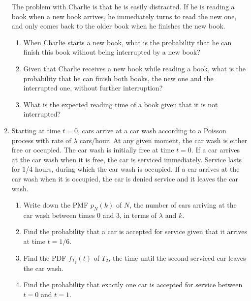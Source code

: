 \documentclass[a4paper,9pt,landscape]{extarticle}
\begin{document}
\begin{multicols*}{3}
\begin{enumerate}
	The problem with Charlie is that he is easily distracted. If he is reading a book when a new book arrives, he immediately turns to read the new one, and only comes back to the older book when he finishes the new book.
	\begin{enumerate}
		\item When Charlie starts a new book, what is the probability that he can finish this book without being interrupted by a new book?
		\item Given that Charlie receives a new book while reading a book, what is the probability that he can finish both books, the new one and the interrupted one, without further interruption?
		\item What is the expected reading time of a book given that it is not interrupted?
	\end{enumerate}
	\item Starting at time $t=0$, cars arrive at a car wash according to a Poisson process with rate of $\lambda$ cars/hour. At any given moment, the car wash is either free or occupied. The car wash is initially free at time $t=0$. If a car arrives at the car wash when it is free, the car is serviced immediately. Service lasts for 1/4 hours, during which the car wash is occupied. If a car arrives at the car wash when it is occupied, the car is denied service and it leaves the car wash.
	\begin{enumerate}
		\item Write down the PMF $p_N(k)$ of $N$, the number of cars arriving at the car wash between times 0 and 3, in terms of $\lambda$ and $k$.
		\item Find the probability that a car is accepted for service given that it arrives at time $t=1/6$.
		\item Find the PDF $f_{T_2}(t)$ of $T_2$, the time until the second serviced car leaves the car wash.
		\item Find the probability that exactly one car is accepted for service between $t=0$ and $t=1$.
	\end{enumerate}
\end{enumerate}

\end{multicols*}
\end{document}
